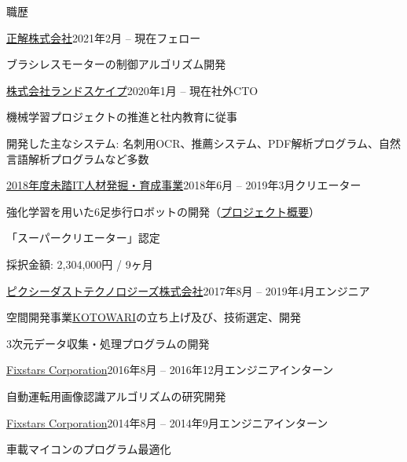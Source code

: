 \documentclass{resume} %
\begin{document}
\begin{rSection}{職歴}

    \begin{rSubsection}{\href{https://www.landscape.co.jp/}{正解株式会社}}{2021年2月 -- 現在}{フェロー}{}
    \item ブラシレスモーターの制御アルゴリズム開発
    \end{rSubsection}

    \begin{rSubsection}{\href{https://www.landscape.co.jp/}{株式会社ランドスケイプ}}{2020年1月 -- 現在}{社外CTO}{}
    \item 機械学習プロジェクトの推進と社内教育に従事
    \item 開発した主なシステム: 名刺用OCR、推薦システム、PDF解析プログラム、自然言語解析プログラムなど多数
    \end{rSubsection}

    \begin{rSubsection}{\href{https://www.mitou.org/}{2018年度未踏IT人材発掘・育成事業}}{2018年6月 -- 2019年3月}{クリエーター}{}
    \item 強化学習を用いた6足歩行ロボットの開発（\href{https://www.ipa.go.jp/jinzai/mitou/2018/gaiyou_tn-1}{プロジェクト概要}）
    \item 「スーパークリエーター」認定
    \item 採択金額: 2,304,000円 / 9ヶ月
    \end{rSubsection}

    \begin{rSubsection}{\href{http://pixiedusttech.com/}{ピクシーダストテクノロジーズ株式会社}}{2017年8月 -- 2019年4月}{エンジニア}{}
    \item 空間開発事業\href{https://pixiedusttech.com/kotowari/}{KOTOWARI}の立ち上げ及び、技術選定、開発
    \item 3次元データ収集・処理プログラムの開発
    \end{rSubsection}

    \begin{rSubsection}{\href{https://www.fixstars.com/en/}{Fixstars Corporation}}{2016年8月 -- 2016年12月}{エンジニアインターン}{}
    \item 自動運転用画像認識アルゴリズムの研究開発
    \end{rSubsection}

    \begin{rSubsection}{\href{https://www.fixstars.com/en/}{Fixstars Corporation}}{2014年8月 -- 2014年9月}{エンジニアインターン}{}
    \item 車載マイコンのプログラム最適化
    \end{rSubsection}

\end{rSection}
\end{document}
